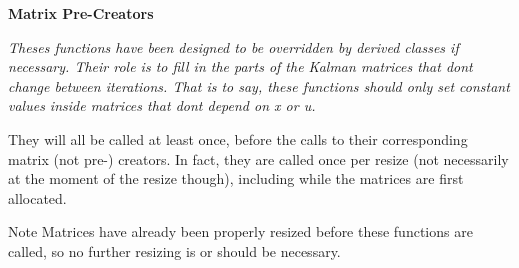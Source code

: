 \begin{Indent}\textbf{ Matrix Pre-\/\+Creators}\par
{\em Theses functions have been designed to be overridden by derived classes if necessary. Their role is to fill in the parts of the Kalman matrices that don\textquotesingle{}t change between iterations. That is to say, these functions should only set constant values inside matrices that don\textquotesingle{}t depend on {\itshape x} or {\itshape u}.

They will all be called at least once, before the calls to their corresponding matrix (not pre-\/) creators. In fact, they are called once per resize (not necessarily at the moment of the resize though), including while the matrices are first allocated.

\begin{DoxyNote}{Note}
Matrices have already been properly resized before these functions are called, so no further resizing is or should be necessary. 


\end{DoxyNote}}
\end{Indent}
